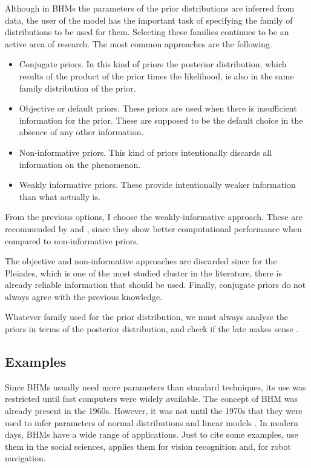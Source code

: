 {\color{red}
Although in BHMs the parameters of the prior distributions are inferred from data, the user of the model has the important task of specifying the family of distributions to be used for them. Selecting these families continues to be an active area of research. The most common approaches are the following.

\begin{itemize}
\item Conjugate priors. In this kind of priors the posterior distribution, which results of the product of the prior times the likelihood, is also in the same family distribution of the prior. 

\item Objective or default priors. These priors are used when there is insufficient information  for the prior. These are supposed to be the default choice in the absence of any other information.

\item Non-informative priors. This kind of priors intentionally discards all information on the phenomenon.

\item Weakly informative priors. These provide intentionally weaker information than what actually is. 
\end{itemize}

From the previous options, I choose the weakly-informative approach. These are recommended by \citet{Gelman2006,Gelman2008,Huang2013} and \citet{Chung2015}, since they show better computational performance when compared to non-informative priors.

The objective and non-informative approaches are discarded since for the Pleiades, which is one of the most studied cluster in the literature, there is already reliable information that should be used. Finally, conjugate priors do not always agree with the previous knowledge. 

Whatever family used for the prior distribution, we must always analyse the priors in terms of the posterior distribution, and check if the late makes sense \cite[][ Chap. 6]{Gelman2006,Gelman2013}.
}

\subsection{Examples}
Since BHMs usually need more parameters than standard techniques, its use was restricted until fast computers were widely available. The concept of BHM was already present in the 1960s. However, it was not until  the 1970s that they were used to infer parameters of normal distributions and linear models \cite[see][for an historical perspective of BHMs]{Good1980}. In modern days, BHMs have a wide range of applications. Just to cite some examples, \citet{Gelman2007} use them in the social sciences, \citet{Fei2005} applies them for vision recognition and, \citet{Diard2008} for robot navigation.

